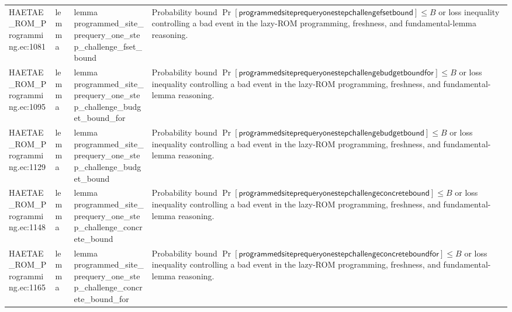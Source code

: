 \documentclass[10pt]{article}
\begin{document}
\begin{longtable}{L{0.11\textwidth}L{0.055\textwidth}L{0.385\textwidth}L{0.41\textwidth}}
HAETAE\_\allowbreak{}ROM\_\allowbreak{}Programming.\allowbreak{}ec:\allowbreak{}1081 & lemma & {\ttfamily\scriptsize lemma programmed\_\allowbreak{}site\_\allowbreak{}prequery\_\allowbreak{}one\_\allowbreak{}step\_\allowbreak{}challenge\_\allowbreak{}fset\_\allowbreak{}bound} & Probability bound $\Pr[\mathsf{programmedsiteprequeryonestepchallengefsetbound}]\le B$ or loss inequality controlling a bad event in the lazy-ROM programming, freshness, and fundamental-lemma reasoning. \\
HAETAE\_\allowbreak{}ROM\_\allowbreak{}Programming.\allowbreak{}ec:\allowbreak{}1095 & lemma & {\ttfamily\scriptsize lemma programmed\_\allowbreak{}site\_\allowbreak{}prequery\_\allowbreak{}one\_\allowbreak{}step\_\allowbreak{}challenge\_\allowbreak{}budget\_\allowbreak{}bound\_\allowbreak{}for} & Probability bound $\Pr[\mathsf{programmedsiteprequeryonestepchallengebudgetboundfor}]\le B$ or loss inequality controlling a bad event in the lazy-ROM programming, freshness, and fundamental-lemma reasoning. \\
HAETAE\_\allowbreak{}ROM\_\allowbreak{}Programming.\allowbreak{}ec:\allowbreak{}1129 & lemma & {\ttfamily\scriptsize lemma programmed\_\allowbreak{}site\_\allowbreak{}prequery\_\allowbreak{}one\_\allowbreak{}step\_\allowbreak{}challenge\_\allowbreak{}budget\_\allowbreak{}bound} & Probability bound $\Pr[\mathsf{programmedsiteprequeryonestepchallengebudgetbound}]\le B$ or loss inequality controlling a bad event in the lazy-ROM programming, freshness, and fundamental-lemma reasoning. \\
HAETAE\_\allowbreak{}ROM\_\allowbreak{}Programming.\allowbreak{}ec:\allowbreak{}1148 & lemma & {\ttfamily\scriptsize lemma programmed\_\allowbreak{}site\_\allowbreak{}prequery\_\allowbreak{}one\_\allowbreak{}step\_\allowbreak{}challenge\_\allowbreak{}concrete\_\allowbreak{}bound} & Probability bound $\Pr[\mathsf{programmedsiteprequeryonestepchallengeconcretebound}]\le B$ or loss inequality controlling a bad event in the lazy-ROM programming, freshness, and fundamental-lemma reasoning. \\
HAETAE\_\allowbreak{}ROM\_\allowbreak{}Programming.\allowbreak{}ec:\allowbreak{}1165 & lemma & {\ttfamily\scriptsize lemma programmed\_\allowbreak{}site\_\allowbreak{}prequery\_\allowbreak{}one\_\allowbreak{}step\_\allowbreak{}challenge\_\allowbreak{}concrete\_\allowbreak{}bound\_\allowbreak{}for} & Probability bound $\Pr[\mathsf{programmedsiteprequeryonestepchallengeconcreteboundfor}]\le B$ or loss inequality controlling a bad event in the lazy-ROM programming, freshness, and fundamental-lemma reasoning. \\

\end{longtable}
\end{document}
